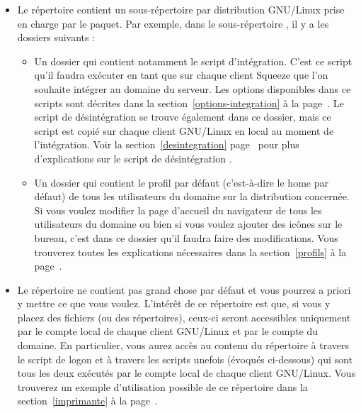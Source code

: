 \begin{itemize}
\item Le répertoire  contient
un sous-répertoire par distribution GNU/Linux prise en
charge par le paquet. Par exemple, dans le sous-répertoire
, il y a les dossiers suivants :

\begin{itemize}

\item Un dossier 
 qui contient
notamment le script d'intégration.
C'est ce script qu'il faudra exécuter en tant que 
sur chaque client Squeeze que l'on souhaite intégrer au domaine
du serveur. Les options disponibles dans ce scripts sont
décrites dans la section~\ref{options-integration} à la
page~\pageref{options-integration}.
Le script de \og désintégration \fg{} se trouve
également dans ce dossier, mais ce script est copié sur chaque
client GNU/Linux en local au moment de l'intégration. Voir la
section~\ref{desintegration} page~\pageref{desintegration}
pour plus d'explications sur le script de \og désintégration \fg.


\item Un dossier  qui contient le profil
par défaut (c'est-à-dire le home par défaut) de tous les utilisateurs
du domaine sur la distribution concernée. Si vous voulez
modifier la page d'accueil du navigateur de tous les
utilisateurs du domaine ou bien si vous voulez ajouter
des icônes sur le bureau, c'est dans ce dossier qu'il
faudra faire des modifications. Vous trouverez toutes
les explications nécessaires dans la section~\ref{profils} à la
page~\pageref{profils}.

\end{itemize}

\item Le répertoire  ne contient
pas grand chose par défaut et vous pourrez a priori y mettre
ce que vous voulez. L'intérêt de ce répertoire
est que, si vous y placez des fichiers (ou des
répertoires), ceux-ci seront accessibles uniquement
par le compte
 local de chaque client GNU/Linux et par le
compte  du domaine. 
En particulier, vous aurez accès au contenu du
répertoire 
à travers le script de logon et à travers les scripts
\og unefois \fg{} (évoqués ci-dessous) 
qui sont tous les deux exécutés par le
compte  local de chaque client GNU/Linux.
Vous trouverez
un exemple d'utilisation possible de ce répertoire
dans la section~\ref{imprimante} à la page~\pageref{imprimante}.


\end{itemize}
